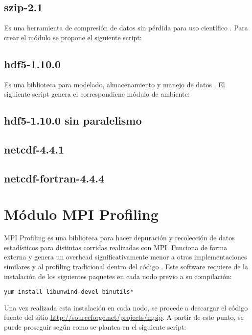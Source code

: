 \subsection{szip-2.1}
Es una herramienta de compresión de datos sin pérdida para uso científico \cite{szip}. Para crear el módulo se propone el siguiente script:



\subsection{hdf5-1.10.0}
Es una biblioteca para modelado, almacenamiento y manejo de datos \cite{hdf5}. El siguiente script genera el correspondiene módulo de ambiente:


\subsection{hdf5-1.10.0 sin paralelismo}


\subsection{netcdf-4.4.1}


\subsection{netcdf-fortran-4.4.4}


\section{Módulo MPI Profiling}
MPI Profiling es una biblioteca para hacer depuración y recolección de datos estadísticos para distintas corridas realizadas con MPI. Funciona de forma externa y genera un overhead significativamente menor a otras implementaciones similares y al profiling tradicional dentro del código \cite{mpip}. Este software requiere de la instalación de los siguientes paquetes en cada nodo previo a su compilación:

\begin{lstlisting}
yum install libunwind-devel binutils*
\end{lstlisting}

Una vez realizada esta instalación en cada nodo, se procede a descargar el código fuente del sitio \url{http://sourceforge.net/projects/mpip}. A partir de este punto, se puede proseguir según como se plantea en el siguiente script:

